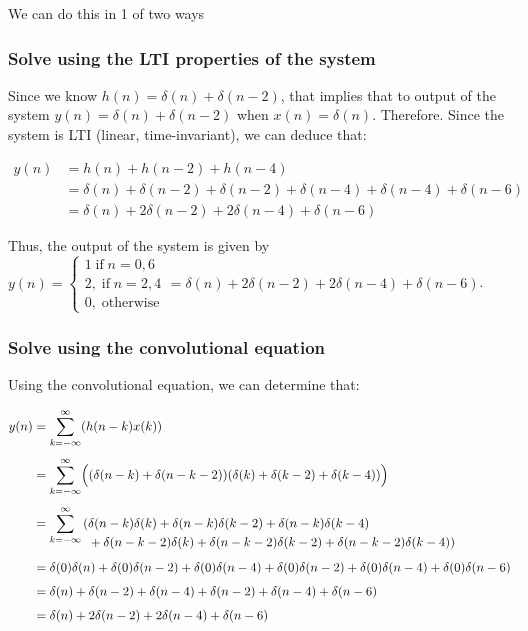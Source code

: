 \documentclass{article}
\newenvironment{directsubsubs}{
  \makeatletter
  \renewcommand\thesubsubsection{\thesection.\Roman{subsubsection}}
  \makeatother
}{
  \makeatletter
  \renewcommand\thesubsubsection{\thesubsection.\Roman{subsubsection}}
  \makeatother
}
\renewcommand{\thesubsection}{\thesection.\alph{subsection}}
\renewcommand{\thesubsubsection}{\thesection.\alph{subsection}.\Roman{subsubsection}}
\begin{document}
We can do this in 1 of two ways

\begin{directsubsubs}

	\subsubsection{Solve using the LTI properties of the system}
	Since we know $h(n) = \delta(n) + \delta(n - 2)$, that implies that to output of the system $y(n) = \delta(n) + \delta(n - 2)$ when $x(n) = \delta(n)$. Therefore. Since the system is LTI (linear, time-invariant), we can deduce that:

	\begin{align*}
		y(n) &= h(n) + h(n - 2) + h(n - 4) \\
		&= \delta(n) + \delta(n - 2) + \delta(n - 2) + \delta(n - 4) + \delta(n - 4) + \delta(n - 6) \\
		&= \delta(n) + 2\delta(n - 2) + 2\delta(n - 4) + \delta(n - 6)
	\end{align*}

	Thus, the output of the system is given by $y(n) = \begin{cases} 1 \; \text{if} \; n = 0, 6 \\ 2, \; \text{if} \; n = 2, 4 \\0, \; \text{otherwise} \end{cases} = \delta(n) + 2\delta(n - 2) + 2\delta(n - 4) + \delta(n - 6)$.

	\subsubsection{Solve using the convolutional equation}
	Using the convolutional equation, we can determine that:

	\begin{align*}
		y(n) &= \sum_{k = -\infty}^{\infty} (h(n - k)x(k)) \\[4pt]
		&= \sum_{k = -\infty}^{\infty} 
			\Bigl( (\delta(n - k) + \delta(n - k - 2))
			 (\delta(k) + \delta(k - 2) + \delta(k - 4)) \Bigr) \\[4pt]
		&= \sum_{k = -\infty}^{\infty} 
		\begin{aligned}[t]
			(&\delta(n - k)\delta(k) 
			+ \delta(n - k)\delta(k - 2) 
			+ \delta(n - k)\delta(k - 4) \\
			&+ \delta(n - k - 2)\delta(k)
			+ \delta(n - k - 2)\delta(k - 2)
			+ \delta(n - k - 2)\delta(k - 4))
		\end{aligned} \\[4pt]
		&= \delta(0)\delta(n) + \delta(0)\delta(n - 2) + \delta(0)\delta(n - 4)
		   + \delta(0)\delta(n - 2) + \delta(0)\delta(n - 4) + \delta(0)\delta(n - 6) \\[4pt]
		&= \delta(n) + \delta(n - 2) + \delta(n - 4) 
		   + \delta(n - 2) + \delta(n - 4) + \delta(n - 6) \\[4pt]
		&= \delta(n) + 2\delta(n - 2) + 2\delta(n - 4) + \delta(n - 6)
	\end{align*}


\end{directsubsubs}
\end{document}
